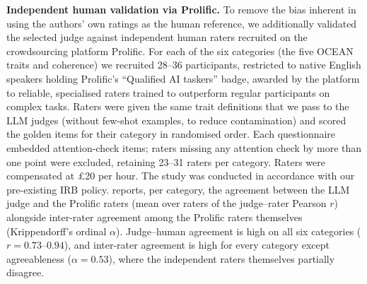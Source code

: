 \textbf{Independent human validation via Prolific.}
To remove the bias inherent in using the authors' own ratings as the human reference, we additionally validated the selected judge against independent human raters recruited on the crowdsourcing platform Prolific. For each of the six categories (the five OCEAN traits and coherence) we recruited 28--36 participants, restricted to native English speakers holding Prolific's ``Qualified AI taskers'' badge, awarded by the platform to reliable, specialised raters trained to outperform regular participants on complex tasks. Raters were given the same trait definitions that we pass to the LLM judges (without few-shot examples, to reduce contamination) and scored the golden items for their category in randomised order. Each questionnaire embedded attention-check items; raters missing any attention check by more than one point were excluded, retaining 23--31 raters per category. Raters were compensated at \pounds20 per hour. The study was conducted in accordance with our pre-existing IRB policy.  reports, per category, the agreement between the LLM judge and the Prolific raters (mean over raters of the judge--rater Pearson $r$) alongside inter-rater agreement among the Prolific raters themselves (Krippendorff's ordinal $\alpha$). Judge--human agreement is high on all six categories ($r = 0.73$--$0.94$), and inter-rater agreement is high for every category except agreeableness ($\alpha = 0.53$), where the independent raters themselves partially disagree.

